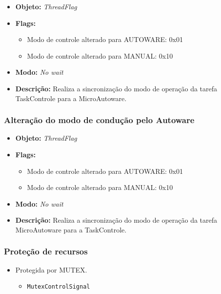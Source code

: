 	\begin{itemize}
		\item \textbf{Objeto:} \textit{ThreadFlag}
		\item \textbf{Flags:}
		\begin{itemize}
			\item Modo de controle alterado para AUTOWARE: 0x01
			\item Modo de controle alterado para MANUAL: 0x10
			
		\end{itemize}
		\item \textbf{Modo:} \textit{No wait}
		\item \textbf{Descrição:} Realiza a sincronização do modo de operação da tarefa TaskControle para a MicroAutoware.
		
	\end{itemize}

\subsubsection*{Alteração do modo de condução pelo Autoware}
	
	\begin{itemize}
		\item \textbf{Objeto:} \textit{ThreadFlag}
		\item \textbf{Flags:}
		\begin{itemize}
			\item Modo de controle alterado para AUTOWARE: 0x01
			\item Modo de controle alterado para MANUAL: 0x10
			
		\end{itemize}
		\item \textbf{Modo:} \textit{No wait}
		\item \textbf{Descrição:} Realiza a sincronização do modo de operação da tarefa MicroAutoware para a TaskControle.
		
	\end{itemize}


\subsubsection*{Proteção de recursos}



	
	\begin{itemize}
		\item Protegida por MUTEX.
		\begin{itemize}
			\item \texttt{MutexControlSignal}
			
		\end{itemize}
	\end{itemize}



